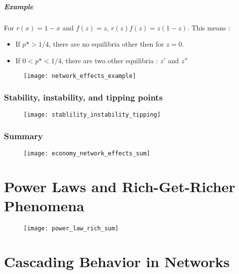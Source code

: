 \paragraph{Example}

For $r(x) = 1-x$ and $f(z) = z$, $r(z)f(z) = z(1-z)$. This means :
\begin{itemize}
\item If $p* > 1/4$, there are no equilibria other then for $z=0$.
\item If $0 < p* < 1/4$, there are two other equilibria : $z'$ and $z''$
\end{itemize}

\begin{figure}[H]
    \centering
    \texttt{[image: network\_effects\_example]}
\end{figure}

\subsection{Stability, instability, and tipping points}

\begin{figure}[H]
    \centering
    \texttt{[image: stablility\_instability\_tipping]}
\end{figure}

\subsection{Summary}

\begin{figure}[H]
    \centering
    \texttt{[image: economy\_network\_effects\_sum]}
\end{figure}

\chapter{Power Laws and Rich-Get-Richer Phenomena}

\begin{figure}[H]
    \centering
    \texttt{[image: power\_law\_rich\_sum]}
\end{figure}

\chapter[Cascading Behavior in Networks]{Cascading Behavior in Networks}

